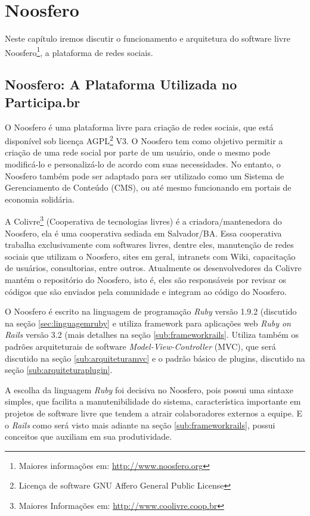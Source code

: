 \chapter{Noosfero}
\label{cap:noosfero}
Neste capítulo iremos discutir o funcionamento e arquitetura do software livre Noosfero\footnote{Maiores informações em: \url{http://www.noosfero.org}}, a plataforma de redes sociais.


\section{Noosfero: A Plataforma Utilizada no Participa.br}
O Noosfero é uma plataforma livre para criação de redes sociais, que está disponível sob licença AGPL\footnote{Licença de software GNU Affero General Public License} V3. O Noosfero tem como objetivo permitir a criação de uma rede social por parte de um usuário, onde o mesmo pode modificá-lo e personalizá-lo de acordo com suas necessidades. No entanto, o Noosfero também pode ser adaptado para ser utilizado como um Sistema de Gerenciamento de Conteúdo (CMS), ou até mesmo funcionando em portais de economia solidária.

A Colivre\footnote{Maiores Informações em: \url{http://www.coolivre.coop.br}} (Cooperativa de tecnologias livres) é a criadora/mantenedora do Noosfero, ela é uma cooperativa sediada em Salvador/BA. Essa cooperativa trabalha exclusivamente com softwares livres, dentre eles, manutenção de redes sociais que utilizam o Noosfero, sites em geral, intranets com Wiki, capacitação de usuários, consultorias, entre outros. Atualmente os desenvolvedores da Colivre mantém o repositório do Noosfero, isto é, eles são responsáveis por revisar os códigos que são enviados pela comunidade e integram ao código do Noosfero.

O Noosfero é escrito na linguagem de programação \textit{Ruby} versão 1.9.2 (discutido na seção \ref{sec:linguagemruby} e utiliza framework para aplicações web \textit{Ruby on Rails} versão 3.2 (mais detalhes na seção \ref{sub:frameworkrails}. Utiliza também os padrões arquiteturais de software \textit{Model-View-Controller} (MVC), que será discutido na seção \ref{sub:arquiteturamvc} e o padrão básico de plugins, discutido na seção \ref{sub:arquiteturaplugin}. 

A escolha da linguagem \textit{Ruby} foi decisiva no Noosfero, pois possui uma sintaxe simples, que facilita a manutenibilidade do sistema, característica importante em projetos de software livre que tendem a atrair colaboradores externos a equipe. E o \textit{Rails} como será visto mais adiante na seção \ref{sub:frameworkrails}, possui conceitos que auxiliam em sua produtividade. \cite{meirelles2013metricas}


